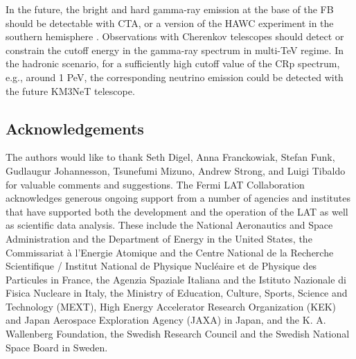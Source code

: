 In the future, the bright and hard gamma-ray emission at the base of the FB
should be detectable
with CTA, or a version of the HAWC experiment in the southern hemisphere 
\citep{2017APS..APR.R4005M, 2017arXiv170909624A, 2018Galax...6...47R}.
Observations with Cherenkov telescopes should detect or constrain the cutoff energy in the gamma-ray spectrum in multi-TeV regime.
In the hadronic scenario, for a sufficiently high cutoff value of the CRp spectrum, e.g., around 1 PeV,
the corresponding neutrino emission could be detected with the future KM3NeT telescope.


\subsection*{Acknowledgements}

The authors would like to thank 
Seth Digel, Anna Franckowiak, Stefan Funk, Gudlaugur Johannesson, Tsunefumi Mizuno, Andrew Strong, and Luigi Tibaldo 
for valuable comments and suggestions.
The Fermi LAT Collaboration acknowledges generous ongoing support from a number of agencies and institutes that have supported both the development and the operation of the LAT as well as scientific data analysis. These include the National Aeronautics and Space Administration and the Department of Energy in the United States, the Commissariat à l'Energie Atomique and the Centre National de la Recherche Scientifique / Institut National de Physique Nucléaire et de Physique des Particules in France, the Agenzia Spaziale Italiana and the Istituto Nazionale di Fisica Nucleare in Italy, the Ministry of Education, Culture, Sports, Science and Technology (MEXT), High Energy Accelerator Research Organization (KEK) and Japan Aerospace Exploration Agency (JAXA) in Japan, and the K. A. Wallenberg Foundation, the Swedish Research Council and the Swedish National Space Board in Sweden.




